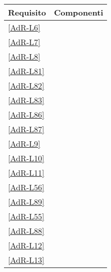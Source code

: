 \begin{longtable}{|>{\centering}m{2cm}|m{12cm}|}
	\hline \textbf{Requisito} & \textbf{Componenti} \tabularnewline 
	\endfirsthead
	\hline \ref{AdR-L6} & \coderef{Framework::Controller::GenericBubble} \tabularnewline %
	\hline \ref{AdR-L7} & \coderef{Framework::Controller::GenericBubble} \tabularnewline 
	\hline \ref{AdR-L8} & \coderef{Framework::Model::API::DBOperations::DBOperations} \tabularnewline
	\hline \ref{AdR-L81} & \coderef{Framework::Model::API::DBOperations::DBOperations} \tabularnewline
	\hline \ref{AdR-L82} & \coderef{Framework::Model::API::DBOperations::DBOperations} \tabularnewline
	\hline \ref{AdR-L83} & \coderef{Framework::Model::API::DBOperations::DBOperations} \tabularnewline %
	\hline \ref{AdR-L86} & \coderef{Framework::Controller::GenericBubble} \tabularnewline
	\hline \ref{AdR-L87} & \coderef{Framework::Controller::GenericBubble} \tabularnewline
	\hline \ref{AdR-L9} & \coderef{Framework::Model::API::LifeCycle::LifeCycle} \tabularnewline
	\hline \ref{AdR-L10} & \coderef{Framework::Model::API::LifeCycle::LifeCycle} \tabularnewline
	\hline \ref{AdR-L11} & \coderef{Framework::Controller::GenericBubble} \linebreak \coderef{Framework::View::GUIContainer} \linebreak 
	\tabularnewline %
	\hline \ref{AdR-L56} & \coderef{Framework::Controller::GenericBubble} \linebreak \coderef{Framework::View::GUIContainer} \linebreak 
	\tabularnewline
	\hline \ref{AdR-L89} & \coderef{Framework::Model::API::DBOperations::DBOperations} \linebreak \coderef{Framework::Controller::GenericBubble} \linebreak \coderef{Framework::View::GUIContainer} \tabularnewline
	\hline \ref{AdR-L55} & \coderef{Framework::Controller::GenericBubble} \linebreak \coderef{Framework::View::GUIContainer} \tabularnewline
	\hline \ref{AdR-L88} & \coderef{Framework::Controller::GenericBubble} \linebreak \coderef{Framework::View::GUIContainer} \tabularnewline
	\hline \ref{AdR-L12} & \coderef{Framework::View::GUI::Label} \linebreak
	\tabularnewline %
	\hline \ref{AdR-L13} & \coderef{Framework::View::GUI::GUIContainer} \linebreak 

\end{longtable}
